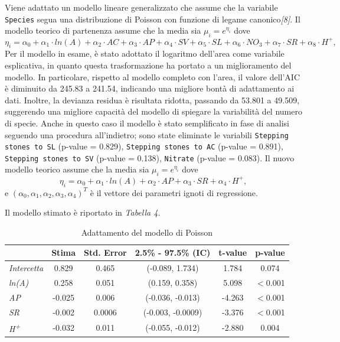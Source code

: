 \documentclass{article} %
\begin{document}
Viene adattato un modello lineare generalizzato che assume che la variabile \texttt{Species} segua una distribuzione di Poisson con funzione di legame canonico\textit{[8]}. 
Il modello teorico di partenenza assume che la media sia $\mu_i=e^{\eta_i}$ dove
\[
\eta_i =\alpha_0+\alpha_1 \cdot ln(A)+ \alpha_2\cdot AC +\alpha_3\cdot AP +\alpha_4\cdot SV +\alpha_5\cdot SL +\alpha_6\cdot NO_3 +\alpha_7\cdot SR + \alpha_8\cdot H^+,
\]
Per il modello in esame, è stato adottato il logaritmo dell'area come variabile esplicativa, in quanto questa trasformazione ha portato a un miglioramento del modello. In particolare, rispetto al modello completo con l'area, il valore dell'AIC è diminuito da 245.83 a 241.54, indicando una migliore bontà di adattamento ai dati. Inoltre, la devianza residua è risultata ridotta, passando da 53.801 a 49.509, suggerendo una migliore capacità del modello di spiegare la variabilità del numero di specie.
Anche in questo caso il modello è stato semplificato in fase di analisi seguendo una procedura all'indietro; sono state eliminate le variabili \texttt{Stepping stones to SL} (p-value = 0.829), \texttt{Stepping stones to AC} (p-value = 0.891), \texttt{Stepping stones to SV} (p-value = 0.138), \texttt{Nitrate} (p-value = 0.083).  
Il nuovo modello teorico assume che la media sia $\mu_i=e^{\eta_i}$ dove
\[
\eta_i=\alpha_0+\alpha_1 \cdot ln(A)+\alpha_2\cdot AP +\alpha_3\cdot SR+\alpha_4\cdot H^+ ,
\]
e $(\alpha_0,\alpha_1,\alpha_2,\alpha_3,\alpha_4)^T$ è il vettore dei parametri ignoti di regressione.

Il modello stimato è riportato in \textit{Tabella 4}.
\begin{table}[H]
    \centering
    \renewcommand{\arraystretch}{1.4} %
    \begin{tabular}{lccccc}
        \toprule
        &  Stima &  Std. Error & 2.5\% - 97.5\% (IC) & t-value &  p-value \\
        \midrule  
            \textit{Intercetta}  & 0.829  & 0.465  & (-0.089, 1.734) & 1.784 & 0.074  \\
            \textit{ln(A)}  & 0.258  & 0.051  & (0.159, 0.358) & 5.098 & $<$0.001 \\
            \textit{AP}  & -0.025 & 0.006  & (-0.036, -0.013) &-4.263 & $<$0.001 \\
            \textit{SR}  & -0.002 & 0.0006 & (-0.003, -0.0009) & -3.376 & $<$0.001 \\
            \textit{H\textsuperscript{+}}  & -0.032 & 0.011  & (-0.055, -0.012) & -2.880 & 0.004 \\
        \bottomrule
    \end{tabular}
    \caption{Adattamento del modello di Poisson}
\end{table}
\end{document}
